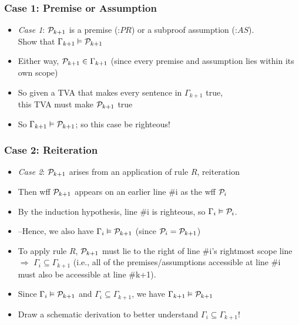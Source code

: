 \begin{frame}
\frametitle{Case 1: Premise or Assumption}

\begin{itemize}[<+->]

\item \emph{Case 1}: $\mathcal{P}_{k +1}$ is a premise (:$PR$) or a subproof assumption (:$AS$). \\ Show that $\Gamma_{k+1} \vDash \mathcal{P}_{k+1}$

\item Either way, $\mathcal{P}_{k +1} \in \Gamma_{k+1}$ (since every premise and assumption lies within its own scope)

\item So given a TVA that makes every sentence in $\Gamma_{k+1}$ true, \\ this TVA must make $\mathcal{P}_{k +1} $ true 

\item So $\Gamma_{k+1} \vDash \mathcal{P}_{k+1}$; so this case be righteous! 

\end{itemize}
\end{frame}

\begin{frame}
\frametitle{Case 2: Reiteration}

\begin{itemize}[<+->]

\item \emph{Case 2}: $\mathcal{P}_{k +1}$ arises from an application of rule $R$, reiteration

\item Then wff $\mathcal{P}_{k +1}$ appears on an earlier line \#i as the wff $\mathcal{P}_{i}$

\item By the induction hypothesis, line \#i is righteous, so $\Gamma_{i} \vDash \mathcal{P}_{i}$. 

\item[] --Hence, we also have $\Gamma_{i} \vDash \mathcal{P}_{k+1}$ (since $\mathcal{P}_{i} = \mathcal{P}_{k+1}$)

\item To apply rule $R$, $\mathcal{P}_{k +1}$ must lie to the right of   line \#i's rightmost scope line $\Rightarrow$ $\Gamma_{i} \subseteq \Gamma_{k+1}$ (i.e., all of the premises/assumptions accessible at line \#i must also be accessible at line \#k+1). 

\item Since $\Gamma_{i} \vDash \mathcal{P}_{k+1}$ and $\Gamma_{i} \subseteq \Gamma_{k+1}$, we have  $\Gamma_{k+1} \vDash \mathcal{P}_{k+1}$

\item Draw a schematic derivation to better understand $\Gamma_{i} \subseteq \Gamma_{k+1}$!



\end{itemize}
\end{frame}

